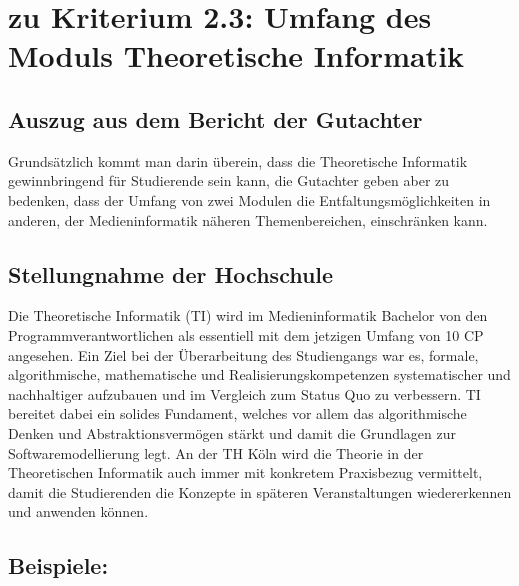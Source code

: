 \section{zu Kriterium 2.3: Umfang des Moduls Theoretische
Informatik\label{/mi-2017/selbstbericht/auflagen/0000-auflagen}}\label{zu-kriterium-2.3-umfang-des-moduls-theoretische-informatikpathlabelmi-2017selbstberichtauflagen0000-auflagen}

\subsection{Auszug aus dem Bericht der
Gutachter\label{/mi-2017/selbstbericht/auflagen/0000-auflagen}}\label{auszug-aus-dem-bericht-der-gutachterpathlabelmi-2017selbstberichtauflagen0000-auflagen-1}

\begin{siderules}
Grundsätzlich kommt man darin überein, dass die Theoretische Informatik
gewinnbringend für Studierende sein kann, die Gutachter geben aber zu
bedenken, dass der Umfang von zwei Modulen die Entfaltungsmöglichkeiten
in anderen, der Medieninformatik näheren Themenbereichen, einschränken
kann.
\end{siderules}

\subsection{Stellungnahme der
Hochschule\label{/mi-2017/selbstbericht/auflagen/0000-auflagen}}\label{stellungnahme-der-hochschulepathlabelmi-2017selbstberichtauflagen0000-auflagen}

Die Theoretische Informatik (TI) wird im Medieninformatik Bachelor von
den Programmverantwortlichen als essentiell mit dem jetzigen Umfang von
10 CP angesehen. Ein Ziel bei der Überarbeitung des Studiengangs war es,
formale, algorithmische, mathematische und Realisierungskompetenzen
systematischer und nachhaltiger aufzubauen und im Vergleich zum Status
Quo zu verbessern. TI bereitet dabei ein solides Fundament, welches vor
allem das algorithmische Denken und Abstraktionsvermögen stärkt und
damit die Grundlagen zur Softwaremodellierung legt. An der TH Köln wird
die Theorie in der Theoretischen Informatik auch immer mit konkretem
Praxisbezug vermittelt, damit die Studierenden die Konzepte in späteren
Veranstaltungen wiedererkennen und anwenden können.

\subsection{Beispiele:\label{/mi-2017/selbstbericht/auflagen/0000-auflagen}}\label{beispielepathlabelmi-2017selbstberichtauflagen0000-auflagen}

